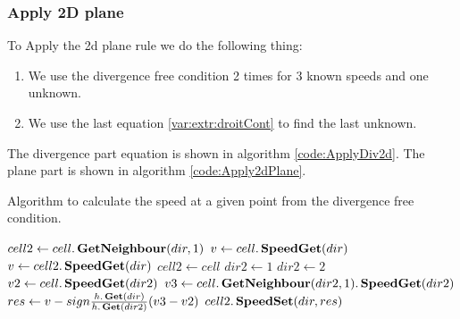 \subsubsection{Apply 2D plane}


To Apply the 2d plane rule we do the following thing:
\begin{enumerate}
\item We use the divergence free condition 2 times for 3 known speeds and one unknown.
\item We use the last equation \ref{var:extr:droitCont} to find the last unknown.
\end{enumerate}
The divergence part equation is shown in algorithm \ref{code:ApplyDiv2d}.
The plane part is shown in algorithm \ref{code:Apply2dPlane}.

\begin{algorithm}
\caption{Algorithm to calculate the speed at a given point from the divergence free condition.}
\label{code:ApplyDiv2d}
\begin{algorithmic}[1]
 
	\State $cell2\gets cell.\mathop{\textbf{GetNeighbour}}(dir,1)$ 
	\State $v \gets cell.\mathop{\textbf{SpeedGet}}(dir)$ 
	  
	\State $v \gets cell2.\mathop{\textbf{SpeedGet}}(dir)$
	\State $cell2 \gets cell$
	\EndIf
	\State $dir2 \gets 1$ 
	\State $dir2\gets 2$
	\EndIf
	\State $v2 \gets cell.\mathop{\textbf{SpeedGet}}(dir2)$ 
	\State $v3 \gets cell.\mathop{\textbf{GetNeighbour}}(dir2,1).\mathop{\textbf{SpeedGet}}(dir2)$ 
	\State $res \gets v-sign\frac{h.\mathop{\textbf{Get}}(dir)}{h.\mathop{\textbf{Get}}(dir2)}(v3-v2)$ 
	\State $cell2.\mathop{\textbf{SpeedSet}}(dir,res)$ 
\EndFunction
\end{algorithmic}
\end{algorithm}

